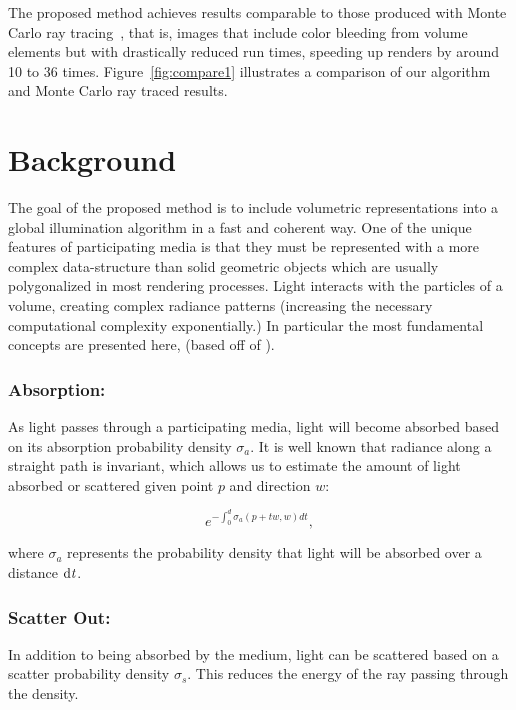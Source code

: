\documentclass[runningheads]{llncs}
\begin{document}
  The proposed method achieves results comparable to those produced with Monte Carlo ray tracing~\cite{MCRay1}, that is, images that include color bleeding from volume elements but with drastically reduced run times, speeding up renders by around 10 to 36 times.  Figure~\ref{fig:compare1} illustrates a comparison of our algorithm and Monte Carlo ray traced results.


\section{Background}
\label{background_sec}
The goal of the proposed method is to include volumetric representations into a global illumination algorithm in a fast and coherent way. One of the unique features of participating media is that they must be represented with a more complex data-structure than solid geometric objects which are usually polygonalized in most rendering processes.  Light interacts with the particles of a volume, creating complex radiance patterns (increasing the necessary computational complexity exponentially.) In particular the most fundamental concepts are presented here,  (based off of  \cite{pbrt}).

\subsubsection{Absorption:}
As light passes through a participating media, light will become absorbed based on its absorption probability density $\sigma_{a}$. It is well known that radiance along a straight path is invariant, which allows us to estimate the amount of light absorbed or scattered given point $p$ and direction $w$:

\begin{equation}
e^{-\int_{0}^{d}\sigma_{a} (p+t\mathit{w},\mathit{w})d\mathit{t}},
\label{siga_eq}
\end{equation}

where $\sigma_{a}$ represents the probability density that light will be absorbed over a distance $\textup{d}\mathit{t}$.

\subsubsection{Scatter Out:}
In addition to being absorbed by the medium, light can be scattered based on a scatter probability density $\sigma_{s}$.  This reduces the energy of the ray passing through the density.
\end{document}

